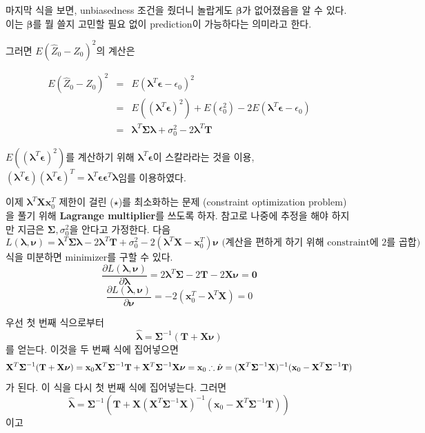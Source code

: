 \documentclass[b5paper,]{scrbook}
\theoremstyle{plain}
\theoremstyle{definition}
\numberwithin{equation}{section}
\begin{document}
마지막 식을 보면, unbiasedness 조건을 줬더니 놀랍게도
\(\boldsymbol{\beta}\)가 없어졌음을 알 수 있다. 이는
\(\boldsymbol{\beta}\)를 뭘 쓸지 고민할 필요 없이 prediction이
가능하다는 의미라고 한다.

그러면 \(E(\hat{Z}_{0}-Z_{0})^{2}\)의 계산은

\begin{eqnarray*}
E(\hat{Z}_{0}-Z_{0})^{2}&=&E(\boldsymbol{\lambda}^{T}\boldsymbol{\epsilon}-\epsilon_{0})^{2}\\
&=&E((\boldsymbol{\lambda}^{T}\boldsymbol{\epsilon})^{2})+E(\epsilon_{0}^{2})-2E(\boldsymbol{\lambda}^{T}\boldsymbol{\epsilon}-\epsilon_{0})\\
&=&\boldsymbol{\lambda}^{T}\boldsymbol{\Sigma}\boldsymbol{\lambda}+\sigma_{0}^{2}-2\boldsymbol{\lambda}^{T}\mathbf{T}
\end{eqnarray*}

\(E((\boldsymbol{\lambda}^{T}\boldsymbol{\epsilon})^{2})\)를 계산하기
위해 \(\boldsymbol{\lambda}^{T}\boldsymbol{\epsilon}\)이 스칼라라는 것을
이용,
\((\boldsymbol{\lambda}^{T}\boldsymbol{\epsilon})(\boldsymbol{\lambda}^{T}\boldsymbol{\epsilon})^{T}=\boldsymbol{\lambda}^{T}\boldsymbol{\epsilon}\boldsymbol{\epsilon}^{T}\boldsymbol{\lambda}\)임를
이용하였다.

이제 \(\boldsymbol{\lambda}^{T}\mathbf{X}\mathbf{x}_{0}^{T}\) 제한이
걸린 (\(\star\))를 최소화하는 문제 (constraint optimization problem)을
풀기 위해 \textbf{Lagrange multiplier}를 쓰도록 하자. 참고로 나중에
추정을 해야 하지만 지금은 \(\boldsymbol{\Sigma}, \sigma_{0}^{2}\)을
안다고 가정한다. 다음 \[
L(\boldsymbol{\lambda},\boldsymbol{\nu})=\boldsymbol{\lambda}^{T}\boldsymbol{\Sigma}\boldsymbol{\lambda}-2\boldsymbol{\lambda}^{T}\mathbf{T}+\sigma_{0}^{2}-2(\boldsymbol{\lambda}^{T}\mathbf{X}-\mathbf{x}_{0}^{T})\boldsymbol{\nu} \text{ (계산을 편하게 하기 위해 constraint에 2를 곱합)}
\] 식을 미분하면 minimizer를 구할 수 있다.
\[\frac{\partial L(\boldsymbol{\lambda},\boldsymbol{\nu})}{\partial \boldsymbol{\lambda}}=2\boldsymbol{\lambda}^{T}\boldsymbol{\Sigma}-2\mathbf{T}-2\mathbf{X}\boldsymbol{\nu}=\mathbf{0}\]
\[\frac{\partial L(\boldsymbol{\lambda},\boldsymbol{\nu})}{\partial \boldsymbol{\nu}}=-2(\mathbf{x}_{0}^{T}-\boldsymbol{\lambda}^{T}\mathbf{X})=0 \]

우선 첫 번째 식으로부터
\[\hat{\boldsymbol{\lambda}}=\boldsymbol{\Sigma}^{-1}(\mathbf{T}+\mathbf{X}\boldsymbol{\nu})\]
를 얻는다. 이것을 두 번째 식에 집어넣으면 \[
\mathbf{X}^{T}\boldsymbol{\Sigma}^{-1}(\mathbf{T}+\mathbf{X}\boldsymbol{\nu})=\mathbf{x}_{0}\\
\mathbf{X}^{T}\boldsymbol{\Sigma}^{-1}\mathbf{T}+\mathbf{X}^{T}\boldsymbol{\Sigma}^{-1}\mathbf{X}\boldsymbol{\nu}=\mathbf{x}_{0}\\
\therefore \hat{\boldsymbol{\nu}}=(\mathbf{X}^{T}\boldsymbol{\Sigma}^{-1}\mathbf{X})^{-1}(\mathbf{x}_{0}-\mathbf{X}^{T}\boldsymbol{\Sigma}^{-1}\mathbf{T})\\
\] 가 된다. 이 식을 다시 첫 번째 식에 집어넣는다. 그러면
\[\hat{\boldsymbol{\lambda}}=\boldsymbol{\Sigma}^{-1}(\mathbf{T}+\mathbf{X}(\mathbf{X}^{T}\boldsymbol{\Sigma}^{-1}\mathbf{X})^{-1}(\mathbf{x}_{0}-\mathbf{X}^{T}\boldsymbol{\Sigma}^{-1}\mathbf{T}))\]
이고
\end{document}
